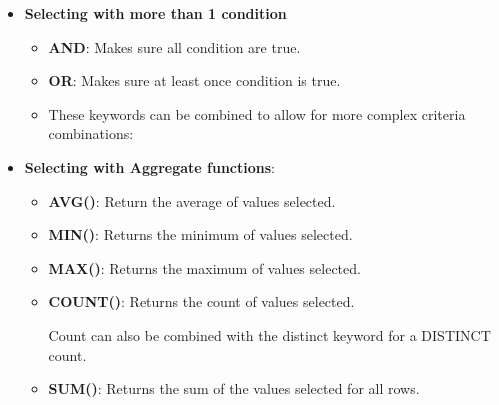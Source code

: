 \begin{flushleft}
\begin{itemize}
		\bigskip 
		\item \textbf{Selecting with more than 1 condition}
		\begin{itemize}
			\item \textbf{AND}: Makes sure all condition are true.
			\bigskip
			\item \textbf{OR}: Makes sure at least once condition is true.
			\bigskip
		
			\item These keywords can be combined to allow for more complex criteria combinations:
			\bigskip
		\end{itemize}
		\item \textbf{Selecting with Aggregate functions}:
		\begin{itemize}
			\item \textbf{AVG()}: Return the average of values selected.
			\bigskip
			\item \textbf{MIN()}: Returns the minimum of values selected.
			\bigskip
			\item \textbf{MAX()}: Returns the maximum of values selected.
			\bigskip
			\item \textbf{COUNT()}: Returns the count of values selected.
			\bigskip

			Count can also be combined with the distinct keyword for a DISTINCT count.
			\bigskip
			\item \textbf{SUM()}: Returns the sum of the values selected for all rows.
			\bigskip
		\end{itemize}
		

\end{itemize}
\end{flushleft}
